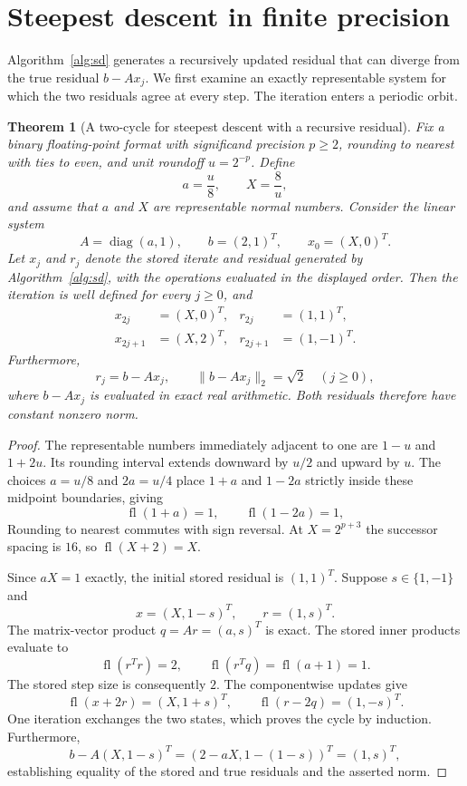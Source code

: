 \documentclass[11pt]{article}
\newtheorem{theorem}{Theorem}
\theoremstyle{definition}
\newcommand{\fl}{\operatorname{fl}}
\newcommand{\diag}{\operatorname{diag}}
\begin{document}
\section{Steepest descent in finite precision}

Algorithm~\ref{alg:sd} generates a recursively updated residual that can
diverge from the true residual $b-Ax_j$.  We first examine an exactly
representable system for which the two residuals agree at every step.
The iteration enters a periodic orbit.

\begin{theorem}[A two-cycle for steepest descent with a recursive residual]
\label{thm:sd-cycle}
Fix a binary floating-point format with significand precision $p\ge2$,
rounding to nearest with ties to even, and unit roundoff $u=2^{-p}$.  Define
\[
 a=\frac{u}{8},\qquad X=\frac{8}{u},
\]
and assume that $a$ and $X$ are representable normal numbers.  Consider the
linear system
\[
 A=\diag(a,1),\qquad b=(2,1)^T,\qquad x_0=(X,0)^T.
\]
Let $x_j$ and $r_j$ denote the stored iterate and residual generated by
Algorithm~\ref{alg:sd}, with the operations evaluated in the displayed
order.  Then the iteration is well defined for every $j\ge0$, and
\[
\begin{aligned}
 x_{2j}&=(X,0)^T,   & r_{2j}&=(1,1)^T,\\
 x_{2j+1}&=(X,2)^T, & r_{2j+1}&=(1,-1)^T.
\end{aligned}
\]
Furthermore,
\[
 r_j=b-Ax_j,
 \qquad
 \|b-Ax_j\|_2=\sqrt{2}
 \quad (j\ge0),
\]
where $b-Ax_j$ is evaluated in exact real arithmetic.  Both residuals
therefore have constant nonzero norm.
\end{theorem}

\begin{proof}
The representable numbers immediately adjacent to one are $1-u$ and
$1+2u$.  Its rounding interval extends downward by $u/2$ and upward by $u$.
The choices $a=u/8$ and $2a=u/4$ place $1+a$ and $1-2a$ strictly
inside these midpoint boundaries, giving
\[
 \fl(1+a)=1,\qquad \fl(1-2a)=1,
\]
Rounding to nearest
commutes with sign reversal.  At $X=2^{p+3}$ the successor spacing is $16$,
so $\fl(X+2)=X$.

Since $aX=1$ exactly, the initial stored residual is $(1,1)^T$.  Suppose
$s\in\{1,-1\}$ and
\[
 x=(X,1-s)^T,\qquad r=(1,s)^T.
\]
The matrix-vector product $q=Ar=(a,s)^T$ is exact.  The stored inner products
evaluate to
\[
 \fl(r^Tr)=2,
 \qquad
 \fl(r^Tq)=\fl(a+1)=1.
\]
The stored step size is consequently $2$.  The componentwise updates give
\[
 \fl(x+2r)=(X,1+s)^T,
 \qquad
 \fl(r-2q)=(1,-s)^T.
\]
One iteration exchanges the two states, which proves the cycle by induction.
Furthermore,
\[
 b-A(X,1-s)^T=(2-aX,1-(1-s))^T=(1,s)^T,
\]
establishing equality of the stored and true residuals and the asserted norm.
\end{proof}
\end{document}
